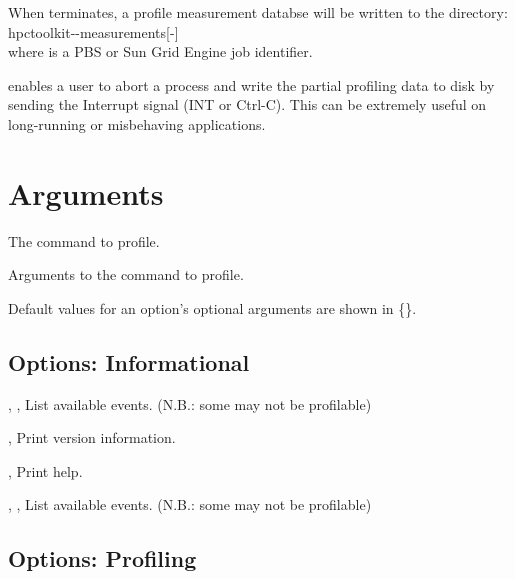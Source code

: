 \documentclass[english]{article}
\begin{document}
When  terminates, a profile measurement databse will be written to the directory:\\
\SP\SP\SP hpctoolkit--measurements[-]\\
where  is a PBS or Sun Grid Engine job identifier.

 enables a user to abort a process and write the partial profiling data to disk by sending the Interrupt signal (INT or Ctrl-C).
This can be extremely useful on long-running or misbehaving applications.


\section{Arguments}

\begin{Description}
\item[\Arg{command}] The command to profile.
\item[\Arg{command-arguments}] Arguments to the command to profile.
\end{Description}

Default values for an option's optional arguments are shown in \{\}.

\subsection{Options: Informational}

\begin{Description}
\item[\Opt{-l}, \Opt{-L}, \Opt{--list-events-short}] List available events. (N.B.: some may not be profilable)
\item[\Opt{-V}, \Opt{--version}] Print version information.
\item[\Opt{-h}, \Opt{--help}] Print help.
\item[\Opt{-l}, \Opt{-L}, \Opt{--list-events}] List available events. (N.B.: some may not be profilable)
\end{Description}

\subsection{Options: Profiling}
\end{document}

